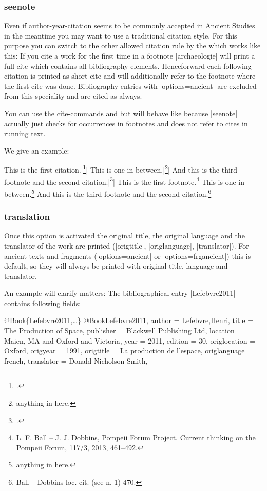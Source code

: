 \documentclass[a4paper,
10pt,
greek,
french,
spanish,
italian,
ngerman,
english,
]{ltxdoc}
\begin{document}
\subsubsection{seenote}\label{seenote}
Even if author-year-citation seems to be commonly accepted in Ancient Studies in the meantime you may want to use a traditional citation style. 
For this purpose you can switch to the other allowed citation rule by the \DAI
which works like this:
If you cite a work for the first time in a footnote |archaeologie| will print a full cite which contains all bibliography elements.
Henceforward each following citation is printed as short cite and will additionally refer to the footnote where the first cite was done.
Bibliography entries with |options={ancient}| are excluded from this speciality and are cited as always.

You can use the cite-commands  and  but  
will behave like  because |seenote| actually just checks for occurrences in footnotes and does not refer to cites in running text.

We give an example:
\begin{tcolorbox}[examplebox] 
This is the first citation.|\footnote{\cite{Ball2013}.}|
This is one in between.|\footnote{anything in here.}|
And this is the third footnote and the second citation.|\footnote{\cite[470]{Ball2013}.}|
\tcblower
This is the first footnote.\footnote{L. F. Ball – J. J. Dobbins, Pompeii Forum Project. Current thinking on the Pompeii Forum, 117/3, 2013, 461–492.}
This is one in between.\footnote{anything in here.}
And this is the third footnote and the second citation.\footnote{Ball – Dobbins loc. cit. (see n. 1) 470.}
\end{tcolorbox}




\subsubsection{translation}\label{translation}
Once this option is activated the original title, the original language and the translator of the work are printed (|origtitle|, |origlanguage|, |translator|).
For ancient texts and fragments (|options={ancient}| or |options={frgancient}|) this is default, 
so they will always be printed with original title, language and translator.

An example will clarify matters:
The bibliographical entry |Lefebvre2011| contains following fields:
\begin{bibexample}[label=Lefebvre2011]{{@}Book\{Lefebvre2011,…\}}
@Book{Lefebvre2011,
  author       = {Lefebvre,Henri},
  title        = {The Production of Space},
  publisher    = {Blackwell Publishing Ltd},
  location     = {Maien, MA and Oxford and Victoria},
  year         = {2011},
  edition      = {30},
  origlocation = {Oxford},
  origyear     = {1991},
  origtitle    = {La production de l’espace},
  origlanguage = {french},
  translator   = {Donald Nicholson-Smith},
}
\end{bibexample}
\end{document}
